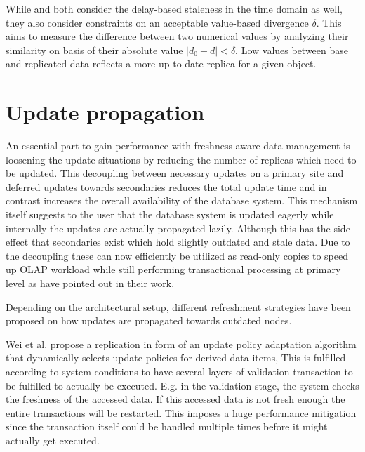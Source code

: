 While \cite{xiang:2008} and \cite{fekete:2018} both consider the delay-based staleness in the time domain as well, they also consider constraints on 
an acceptable value-based divergence $\delta$. This aims to measure the difference between two numerical values by analyzing their similarity on basis of their 
absolute value $|d_0 - d| < \delta $. Low values between base and replicated data reflects a more up-to-date replica for a given object.




\section{Update propagation}
\label{r:replication}
An essential part to gain performance with freshness-aware data management is loosening the update situations by reducing the number of 
replicas which need to be updated. This decoupling between necessary updates on a primary site and deferred updates towards secondaries 
reduces the total update time and in contrast increases the overall availability of the database system. 
This mechanism itself suggests to the user that the database system is updated eagerly while internally the updates are actually propagated lazily. 
Although this has the side effect that secondaries exist which hold slightly outdated and stale data. 
Due to the decoupling these can now efficiently be utilized as read-only copies to speed up OLAP workload while still performing transactional processing 
at primary level as \cite{psaroudakis:2015, rohm:2002, xiang:2008} have pointed out in their work.

Depending on the architectural setup, different refreshment strategies have been proposed on how updates are propagated towards outdated nodes.

Wei et al. \cite{wei:2004} propose a replication in form of an update policy adaptation algorithm that dynamically selects update policies
for derived data items, This is fulfilled according to system conditions to have several layers of validation transaction to be fulfilled to actually be executed.
E.g. in the validation stage, the system checks the freshness of the accessed data. If this accessed data is not fresh enough the entire transactions will be restarted.
This imposes a huge performance mitigation since the transaction itself could be handled multiple times before it might actually get executed.

